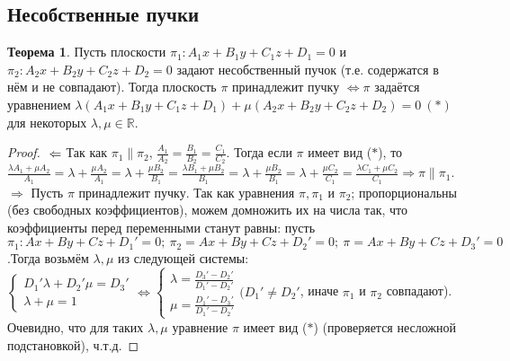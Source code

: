 \documentclass[a4paper, 12pt]{article}
\theoremstyle{definition}
\newtheorem*{theorem}{Теорема}
\begin{document}
	\subsection{Несобственные пучки}
	\begin{theorem}
		Пусть плоскости $\pi_{1}: A_{1}x + B_{1}y + C_{1}z + D_1 = 0$ и $\pi_{2}: A_{2}x + B_{2}y + C_{2}z + D_2 = 0$ задают несобственный пучок (т.е. содержатся в нём и не совпадают). Тогда плоскость $\pi$ принадлежит пучку $\Leftrightarrow \pi$ задаётся уравнением $\lambda(A_{1}x + B_{1}y + C_{1}z + D_1) + \mu(A_{2}x + B_{2}y + C_{2}z + D_2) = 0 \ (*)$ для некоторых $\lambda, \mu \in \mathbb{R}$.
	\end{theorem}
	\begin{proof}
		$\\\Leftarrow$ Так как $\pi_{1} \parallel \pi_{2}$, $\frac{A_{1}}{A_{2}} = \frac{B_{1}}{B_{2}} = \frac{C_1}{C_2}$. Тогда если $\pi$ имеет вид ($*$), то $\frac{\lambda A_{1}+\mu A_{2}}{A_{1}} = \lambda + \frac{\mu A_{2}}{A_{1}} = \lambda + \frac{\mu B_{2}}{B_{1}} = \frac{\lambda B_{1} +\mu B_{2}}{B_{1}} = \lambda + \frac{\mu B_{2}}{B_{1}} = \lambda + \frac{\mu C_{2}}{C_{1}} = \frac{\lambda C_{1} +\mu C_{2}}{C_{1}} \Rightarrow \pi \parallel \pi_{1}$.\\
		$\Rightarrow$ Пусть $\pi$ принадлежит пучку. Так как уравнения $\pi, \pi_{1}$ и $\pi_{2}$; пропорциональны (без свободных коэффициентов), можем домножить их на числа так, что коэффициенты перед переменными станут равны: пусть $\pi_{1}: Ax + By + Cz + D_1' = 0; \ \pi_{2} = Ax + By + Cz + D_2' = 0; \ \pi = Ax + By + Cz + D_3' = 0$.Тогда возьмём $\lambda, \mu$ из следующей системы: $\begin{cases}D_{1}'\lambda + D_{2}'\mu = D_{3}'\\\lambda + \mu = 1\end{cases} \Leftrightarrow \begin{cases}\lambda = \frac{D_{3}'-D_{2}'}{D_{1}'-D_{2}'}\\\mu = \frac{D_{1}' - D_{3}'}{D_{1}' - D_{2}'}\end{cases} (D_{1}' \neq D_{2}'$, иначе $\pi_{1}$ и $\pi_{2}$ совпадают). Очевидно, что для таких $\lambda, \mu$ уравнение $\pi$ имеет вид ($*$) (проверяется несложной подстановкой), ч.т.д.
	\end{proof}
\end{document}
